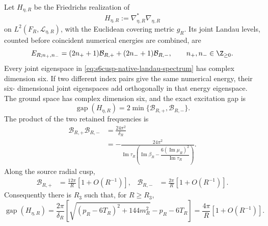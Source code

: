 \begin{theorem}
\label{thm:s6cusp-native-four-dimensional-landau}
Let \(H_{\eta,R}\) be the Friedrichs realization of
\begin{equation}\label{eq:s6cusp-native-magnetic-Hamiltonian}
 H_{\eta,R}:=\nabla_{\eta,R}^*\nabla_{\eta,R}
\end{equation}
on \(L^2(F_R,\mathcal L_{\eta,R})\), with the Euclidean covering metric
\(g_R\).  Its joint Landau levels, counted before coincident numerical
energies are combined, are
\begin{equation}\label{eq:s6cusp-native-landau-spectrum}
 E_{R;n_+,n_-}
 =(2n_++1)\mathcal B_{R,+}
 +(2n_-+1)\mathcal B_{R,-},
 \qquad n_+,n_-\in\Z_{\ge0}.
\end{equation}
Every joint eigenspace in
\eqref{eq:s6cusp-native-landau-spectrum} has complex dimension six.  If
two different index pairs give the same numerical energy, their six-
dimensional joint eigenspaces add orthogonally in that energy eigenspace.
The ground space has complex dimension six, and the exact excitation gap is
\begin{equation}\label{eq:s6cusp-native-landau-gap}
 \operatorname{gap}(H_{\eta,R})
 =2\min\{\mathcal B_{R,+},\mathcal B_{R,-}\}.
\end{equation}
The product of the two retained frequencies is
\begin{align}
 \mathcal B_{R,+}\mathcal B_{R,-}
 &=\frac{24\pi^2}{\delta_R}
 \label{eq:s6cusp-native-frequency-product}\\
 &=-\frac{24\pi^2}{
 \operatorname{Im}\tau_R
 \left(
 \operatorname{Im}\beta_R-
 \dfrac{6(\operatorname{Im}\mu_R)^2}
 {\operatorname{Im}\tau_R}
 \right)}.
 \label{eq:s6cusp-native-frequency-unchanged-expression}
\end{align}
Along the source radial cusp,
\begin{align}
 \mathcal B_{R,+}
 &=\frac{12\pi}{R}\left[1+O(R^{-1})\right],
 &
 \mathcal B_{R,-}
 &=\frac{2\pi}{R}\left[1+O(R^{-1})\right].
 \label{eq:s6cusp-native-frequency-asymptotics}
\end{align}
Consequently there is \(R_3\) such that, for \(R\ge R_3\),
\begin{equation}\label{eq:s6cusp-native-gap-exact-eventual}
 \operatorname{gap}(H_{\eta,R})
 =\frac{2\pi}{\delta_R}
 \left[
 \sqrt{(p_R-6T_R)^2+144m_R^2}-p_R-6T_R
 \right]
 =\frac{4\pi}{R}\left[1+O(R^{-1})\right].
\end{equation}
\end{theorem}

